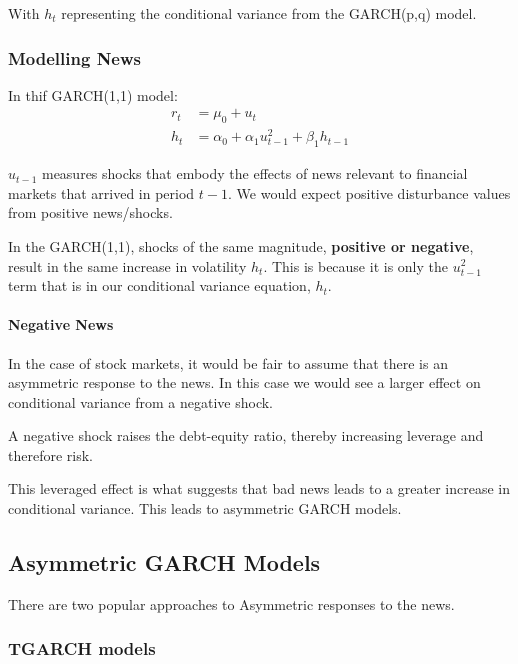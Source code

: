 \documentclass[11pt]{article}
\begin{document}
With $h_t$ representing the conditional variance from the GARCH(p,q) model.

\subsubsection{Modelling News}

In thif GARCH(1,1) model:
\begin{equation}
\begin{aligned}
r_t & =\mu_0+u_t \\
h_t & =\alpha_0+\alpha_1 u_{t-1}^2+\beta_1 h_{t-1}
\end{aligned}
\end{equation}

$u_{t-1}$ measures shocks that embody the effects of news relevant to financial markets that arrived in period $t-1$. We would expect positive disturbance values from positive news/shocks.

In the GARCH(1,1), shocks of the same magnitude, \textbf{positive or negative}, result in the same increase in volatility $h_t$. This is because it is only the $u_{t-1}^2$ term that is in our conditional variance equation, $h_t$.

\paragraph{Negative News}

In the case of stock markets, it would be fair to assume that there is an asymmetric response to the news. In this case we would see a larger effect on conditional variance from a negative shock.

\begin{note}
    A negative shock raises the debt-equity ratio, thereby increasing leverage and therefore risk.
\end{note}

 This leveraged effect is what suggests that bad news leads to a greater increase in conditional variance. This leads to asymmetric GARCH models.

 \subsection{Asymmetric GARCH Models}

 There are two popular approaches to Asymmetric responses to the news.

 \subsubsection{TGARCH models}
\end{document}
